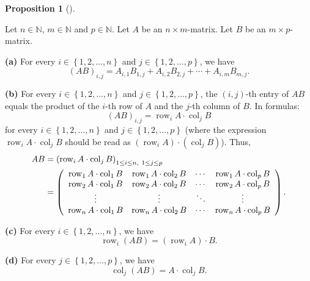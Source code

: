 \documentclass[numbers=enddot,12pt,final,onecolumn,notitlepage]{scrartcl}%
\theoremstyle{definition}
\newtheorem{prop}[theo]{Proposition}
\newenvironment{proposition}[1][]
{\begin{prop}[#1]\begin{leftbar}}
{\end{leftbar}\end{prop}}
\begin{document}
\begin{proposition}
\label{prop.matrix-prod.rc}Let $n\in\mathbb{N}$, $m\in\mathbb{N}$ and
$p\in\mathbb{N}$. Let $A$ be an $n\times m$-matrix. Let $B$ be an $m\times p$-matrix.

\textbf{(a)} For every $i\in\left\{  1,2,\ldots,n\right\}  $ and $j\in\left\{
1,2,\ldots,p\right\}  $, we have%
\[
\left(  AB\right)  _{i,j}=A_{i,1}B_{1,j}+A_{i,2}B_{2,j}+\cdots+A_{i,m}%
B_{m,j}.
\]


\textbf{(b)} For every $i\in\left\{  1,2,\ldots,n\right\}  $ and $j\in\left\{
1,2,\ldots,p\right\}  $, the $\left(  i,j\right)  $-th entry of $AB$ equals
the product of the $i$-th row of $A$ and the $j$-th column of $B$. In
formulas:%
\begin{equation}
\left(  AB\right)  _{i,j}=\operatorname*{row}\nolimits_{i}A\cdot
\operatorname*{col}\nolimits_{j}B \label{eq.prop.matrix-prod.rc.1}%
\end{equation}
for every $i\in\left\{  1,2,\ldots,n\right\}  $ and $j\in\left\{
1,2,\ldots,p\right\}  $ (where the expression $\operatorname*{row}%
\nolimits_{i}A\cdot\operatorname*{col}\nolimits_{j}B$ should be read as
$\left(  \operatorname*{row}\nolimits_{i}A\right)  \cdot\left(
\operatorname*{col}\nolimits_{j}B\right)  $). Thus,
\begin{align*}
AB  &  =\left(  \operatorname*{row}\nolimits_{i}A\cdot\operatorname*{col}%
\nolimits_{j}B\right)  _{1\leq i\leq n,\ 1\leq j\leq p}\\
&  =\left(
\begin{array}
[c]{cccc}%
\operatorname*{row}\nolimits_{1}A\cdot\operatorname*{col}\nolimits_{1}B &
\operatorname*{row}\nolimits_{1}A\cdot\operatorname*{col}\nolimits_{2}B &
\cdots & \operatorname*{row}\nolimits_{1}A\cdot\operatorname*{col}%
\nolimits_{p}B\\
\operatorname*{row}\nolimits_{2}A\cdot\operatorname*{col}\nolimits_{1}B &
\operatorname*{row}\nolimits_{2}A\cdot\operatorname*{col}\nolimits_{2}B &
\cdots & \operatorname*{row}\nolimits_{2}A\cdot\operatorname*{col}%
\nolimits_{p}B\\
\vdots & \vdots & \ddots & \vdots\\
\operatorname*{row}\nolimits_{n}A\cdot\operatorname*{col}\nolimits_{1}B &
\operatorname*{row}\nolimits_{n}A\cdot\operatorname*{col}\nolimits_{2}B &
\cdots & \operatorname*{row}\nolimits_{n}A\cdot\operatorname*{col}%
\nolimits_{p}B
\end{array}
\right)  .
\end{align*}


\textbf{(c)} For every $i\in\left\{  1,2,\ldots,n\right\}  $, we have%
\[
\operatorname*{row}\nolimits_{i}\left(  AB\right)  =\left(
\operatorname*{row}\nolimits_{i}A\right)  \cdot B.
\]


\textbf{(d)} For every $j\in\left\{  1,2,\ldots,p\right\}  $, we have%
\[
\operatorname*{col}\nolimits_{j}\left(  AB\right)  =A\cdot\operatorname*{col}%
\nolimits_{j}B.
\]

\end{proposition}
\end{document}
